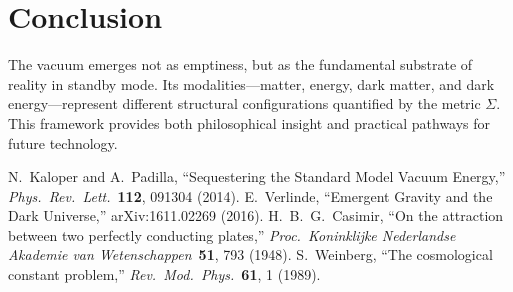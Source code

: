 \documentclass[12pt,a4paper]{article}
\newcommand{\structuring}{\Sigma}
\begin{document}
\section{Conclusion}

The vacuum emerges not as emptiness, but as the fundamental substrate of reality in standby mode. Its modalities—matter, energy, dark matter, and dark energy—represent different structural configurations quantified by the metric $\structuring$. This framework provides both philosophical insight and practical pathways for future technology.


\begin{thebibliography}{9}
 N.~Kaloper and A.~Padilla, ``Sequestering the Standard Model Vacuum Energy,'' \textit{Phys.\ Rev.\ Lett.}\ \textbf{112}, 091304 (2014).
 E.~Verlinde, ``Emergent Gravity and the Dark Universe,'' arXiv:1611.02269 (2016).
 H.~B.~G.~Casimir, ``On the attraction between two perfectly conducting plates,'' \textit{Proc.\ Koninklijke Nederlandse Akademie van Wetenschappen}\ \textbf{51}, 793 (1948).
 S.~Weinberg, ``The cosmological constant problem,'' \textit{Rev.\ Mod.\ Phys.}\ \textbf{61}, 1 (1989).
\end{thebibliography}
\end{document}
